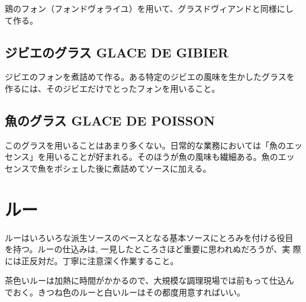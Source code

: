 \documentclass[twoside,12Q,b5paper]{escoffierltjsbook}
\newenvironment{recette}{\begin{multicols}{2}}{\end{multicols}}
\begin{document}
\begin{recette}
鶏のフォン（フォンドヴォライユ）を用いて、グラスドヴィアンドと同様にし
て作る。

\subsection{ジビエのグラス GLACE DE
GIBIER}\label{ux30b8ux30d3ux30a8ux306eux30b0ux30e9ux30b9-glace-de-gibier}

ジビエのフォンを煮詰めて作る。ある特定のジビエの風味を生かしたグラスを
作るには、そのジビエだけでとったフォンを用いること。

\subsection{魚のグラス GLACE DE
POISSON}\label{ux9b5aux306eux30b0ux30e9ux30b9-glace-de-poisson}

このグラスを用いることはあまり多くない。日常的な業務においては「魚のエッ
センス」を用いることが好まれる。そのほうが魚の風味も繊細ある。魚のエッ
センスで魚をポシェした後に煮詰めてソースに加える。

\end{recette}


\section{ルー}\label{ux30ebux30fc}

ルーはいろいろな派生ソースのベースとなる基本ソースにとろみを付ける役目
を持つ。ルーの仕込みは, 一見したところさほど重要に思われぬだろうが、実
際には正反対だ。丁寧に注意深く作業すること。

茶色いルーは加熱に時間がかかるので、大規模な調理現場では前もって仕込ん
でおく。きつね色のルーと白いルーはその都度用意すればいい。
\end{document}
